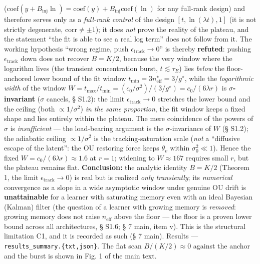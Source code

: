 \documentclass[12pt]{iopart}
\begin{document}
(\(\mathrm{coef}(y + B_{\text{inj}}\ln) = \mathrm{coef}(y) + B_{\text{inj}}\mathrm{coef}(\ln)\) for any full-rank design) and therefore serves only as a \emph{full-rank control} of the design \([t,\ln(\lambda t),1]\) (it is not strictly degenerate, \(\mathrm{corr}\neq\pm1\)); it does \emph{not} prove the reality of the plateau, and the statement ``the fit is able to see a real log term'' does not follow from it. The working hypothesis ``wrong regime, push \(\epsilon_{\text{track}} \to 0\)'' is thereby \textbf{refuted}: pushing \(\epsilon_{\text{track}}\) down does not recover \(B = K/2\), because the very window where the logarithm lives (the transient concentration burst, \(t \lesssim \tau_E\)) lies \emph{below} the floor-anchored lower bound of the fit window \(t_{\min} = 3n_{\text{eff}}^\star = 3/g^\star\), while the \emph{logarithmic width} of the window \(W = t_{\max}/t_{\min} = (c_0/\sigma^2)/(3/g^\star) = c_0/(6\lambda r)\) is \textbf{\(\sigma\)-invariant} (\(\sigma\) cancels, § S1.2): the limit \(\epsilon_{\text{track}} \to 0\) stretches the lower bound and the ceiling (both \(\propto 1/\sigma^2\)) \emph{in the same proportion}, the fit window keeps a fixed shape and lies entirely within the plateau. The mere coincidence of the powers of \(\sigma\) is \emph{insufficient} --- the load-bearing argument is the \(\sigma\)-invariance of \(W\) (§ S1.2); the adiabatic ceiling \(\propto 1/\sigma^2\) is the tracking-saturation scale (\emph{not} a ``diffusive escape of the latent'': the OU restoring force keeps \(\theta_v\) within \(\sigma_0^2 \ll 1\)). Hence the fixed \(W = c_0/(6\lambda r) \approx 1.6\) at \(r = 1\); widening to \(W \approx 167\) requires small \(r\), but the plateau remains flat. \textbf{Conclusion:} the analytic identity \(B = K/2\) (Theorem 1, the limit \(\epsilon_{\text{track}} \to 0\)) is real but is realized \emph{only transiently}; its \emph{numerical} convergence as a slope in a wide asymptotic window under genuine OU drift is \textbf{unattainable} for a learner with saturating memory even with an ideal Bayesian (Kalman) filter (the question of a learner with growing memory is \emph{removed}: growing memory does not raise \(n_{\text{eff}}\) above the floor --- the floor is a proven lower bound across all architectures, § S1.6; § 7 main, item v). This is the structural limitation C1, and it is recorded as such (§ 7 main). Results --- \texttt{results\_summary.\{txt,json\}}. The flat scan \(B/(K/2)\approx0\) against the anchor and the burst is shown in Fig. 1 of the main text.
\end{document}
